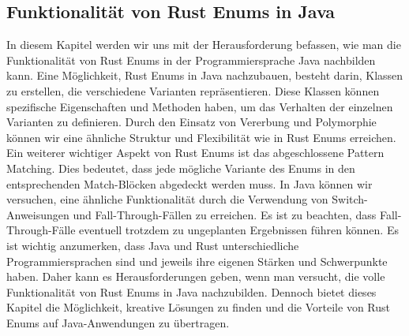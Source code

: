 \documentclass[a4paper, 1ppt]{article}
\begin{document}
\subsection{Funktionalität von Rust Enums in Java}
In diesem Kapitel werden wir uns mit der Herausforderung befassen, wie man die Funktionalität von Rust Enums in der Programmiersprache Java nachbilden kann.
Eine Möglichkeit, Rust Enums in Java nachzubauen, besteht darin, Klassen zu erstellen, die verschiedene Varianten repräsentieren. Diese Klassen können spezifische Eigenschaften und Methoden haben, um das Verhalten der einzelnen Varianten zu definieren. Durch den Einsatz von Vererbung und Polymorphie können wir eine ähnliche Struktur und Flexibilität wie in Rust Enums erreichen.
Ein weiterer wichtiger Aspekt von Rust Enums ist das abgeschlossene Pattern Matching. Dies bedeutet, dass jede mögliche Variante des Enums in den entsprechenden Match-Blöcken abgedeckt werden muss. In Java können wir versuchen, eine ähnliche Funktionalität durch die Verwendung von Switch-Anweisungen und Fall-Through-Fällen zu erreichen. Es ist zu beachten, dass Fall-Through-Fälle eventuell trotzdem zu ungeplanten Ergebnissen führen können.
Es ist wichtig anzumerken, dass Java und Rust unterschiedliche Programmiersprachen sind und jeweils ihre eigenen Stärken und Schwerpunkte haben. Daher kann es Herausforderungen geben, wenn man versucht, die volle Funktionalität von Rust Enums in Java nachzubilden. Dennoch bietet dieses Kapitel die Möglichkeit, kreative Lösungen zu finden und die Vorteile von Rust Enums auf Java-Anwendungen zu übertragen.
\end{document}
